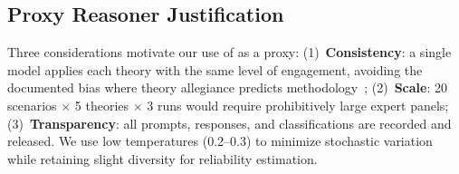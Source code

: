 \subsection{Proxy Reasoner Justification}
\label{sec:proxy}

Three considerations motivate our use of \gptmodel as a proxy:
(1)~\textbf{Consistency}: a single model applies each theory with the same level of engagement, avoiding the documented bias where theory allegiance predicts methodology~\citep{yaron2022contrast};
(2)~\textbf{Scale}: 20 scenarios $\times$ 5 theories $\times$ 3 runs would require prohibitively large expert panels;
(3)~\textbf{Transparency}: all prompts, responses, and classifications are recorded and released.
We use low temperatures (0.2--0.3) to minimize stochastic variation while retaining slight diversity for reliability estimation.
